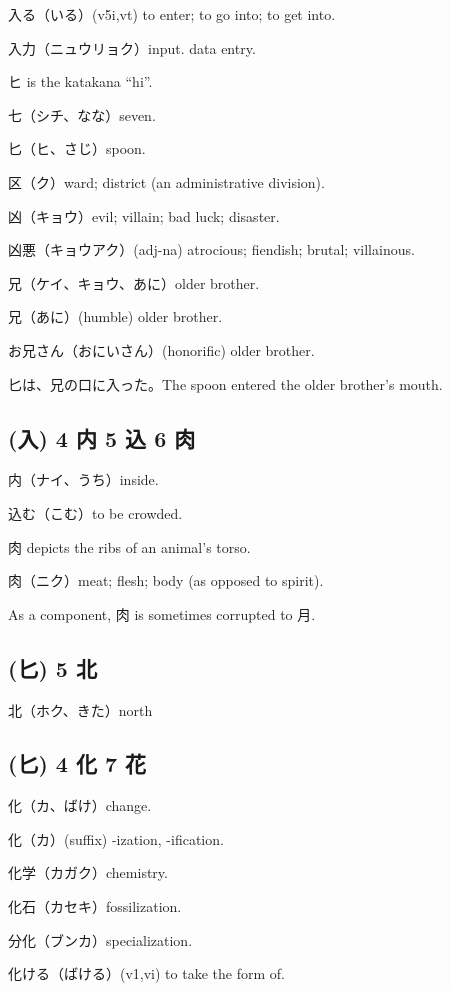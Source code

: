 入る（いる）(v5i,vt)
to enter; to go into; to get into.

入力（ニュウリョク）input. data entry.

ヒ is the katakana ``hi''.

七（シチ、なな）seven.

匕（ヒ、さじ）spoon.

区（ク）ward; district (an administrative division).

凶（キョウ）evil; villain; bad luck; disaster.

凶悪（キョウアク）(adj-na) atrocious; fiendish; brutal; villainous.

兄（ケイ、キョウ、あに）older brother.

兄（あに）(humble) older brother.

お兄さん（おにいさん）(honorific) older brother.

匕は、兄の口に入った。The spoon entered the older brother's mouth.

\subsection{(入) 4 内 5 込 6 肉}

内（ナイ、うち）inside.

込む（こむ）to be crowded.

肉 depicts the ribs of an animal's torso.

肉（ニク）meat; flesh; body (as opposed to spirit).

As a component, 肉 is sometimes corrupted to 月.

\subsection{(匕) 5 北}

北（ホク、きた）north

\subsection{(匕) 4 化 7 花}

化（カ、ばけ）change.

化（カ）(suffix) -ization, -ification.

化学（カガク）chemistry.

化石（カセキ）fossilization.

分化（ブンカ）specialization.

化ける（ばける）(v1,vi) to take the form of.

